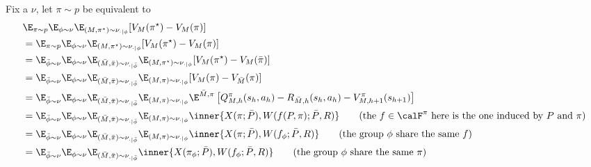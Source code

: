Fix a $\nu$, let $\pi \sim p$ be equivalent to  
\begin{align*}
&\E_{\pi\sim p}\E_{\phi\sim\nu}\E_{(M,\pi^\star)\sim\nu_{\cdot|\phi}}[V_M(\pi^\star)-V_{M}(\pi)]  \\
&=\E_{\pi\sim p}\E_{\phi\sim\nu}\E_{(M,\pi^\star)\sim\nu_{\cdot|\phi}}[V_M(\pi^\star)-V_{M}(\pi)] \\
&= \E_{\bar{\phi}\sim \nu} \E_{\phi\sim \nu} \E_{(\bar{M}, \bar{\pi})\sim\nu_{\cdot|\bar{\phi}}} \E_{(M,\pi^\star)\sim\nu_{\cdot|\phi}} [V_M(\pi^\star)-V_{M}(\bar{\pi})] \\
&= \E_{\bar{\phi}\sim \nu} \E_{\phi\sim \nu} \E_{(\bar{M}, \bar{\pi})\sim\nu_{\cdot|\bar{\phi}}} \E_{(M,\pi)\sim\nu_{\cdot|\phi}} [V_M(\pi)-V_{\bar{M}}(\pi)] \\ 
&= \E_{\bar{\phi}\sim \nu} \E_{\phi\sim \nu} \E_{(\bar{M}, \bar{\pi})\sim\nu_{\cdot|\bar{\phi}}} \E_{(M,\pi)\sim\nu_{\cdot|\phi}}  \E^{\bar{M}, \pi}\left[ Q^\pi_{M,h}(s_h,a_h) - R_{\bar{M},h}(s_h,a_h) - V^\pi_{M,h+1}(s_{h+1}) \right]   \\
&= \E_{\bar{\phi}\sim \nu} \E_{\phi\sim \nu} \E_{(\bar{M}, \bar{\pi})\sim\nu_{\cdot|\bar{\phi}}} \E_{(M,\pi)\sim\nu_{\cdot|\phi}}  \inner{X(\pi; \bar{P}), W(f(P,\pi); \bar{P}, R)}  \tag{the $f\in\calF^\pi$ here is the one induced by $P$ and $\pi$} \\
&= \E_{\bar{\phi}\sim \nu} \E_{\phi\sim \nu} \E_{(\bar{M}, \bar{\pi})\sim\nu_{\cdot|\bar{\phi}}} \E_{(M,\pi)\sim\nu_{\cdot|\phi}}  \inner{X(\pi; \bar{P}), W(f_\phi; \bar{P}, R)}    \tag{the group $\phi$ share the same $f$} \\
&= \E_{\bar{\phi}\sim \nu} \E_{\phi\sim \nu} \E_{(\bar{M}, \bar{\pi})\sim\nu_{\cdot|\bar{\phi}}}   \inner{X(\pi_\phi; \bar{P}), W(f_\phi; \bar{P}, R)}    \tag{the group $\phi$ share the same $\pi$} 
\end{align*}


